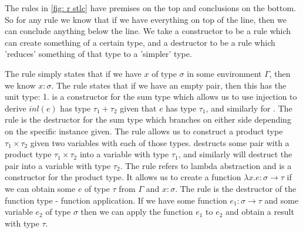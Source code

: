 \noindent
The rules in \ref{fig: r stlc} have premises on the top and conclusions on the bottom. So for any rule
we know that if we have everything on top of the line, then we can conclude anything below the line.
We take a constructor to be a rule which can create something of a certain type, and a destructor to be 
a rule which 'reduces' something of that type to a 'simpler' type.

The  rule simply states that if we have $x$ of type $\sigma$ in some environment $\Gamma$, 
then we know $x: \sigma$. The  rule states that if we have an empty pair, then this has 
the unit type: 1.  is a constructor for the sum type which allows us to use injection 
to derive $inl(e)$ has type $\tau_1 + \tau_2$ given that $e$ has type $\tau_1$, and similarly for 
. The  rule is the destructor for the sum type which branches on either
side depending on the specific instance given. %
The  rule allows us to construct a product type $\tau_1 \times \tau_2$ given two variables
with each of those types.  destructs some pair with a product type $\tau_1 \times \tau_2$ 
into a variable with type $\tau_1$, and similarly  will destruct the pair into a variable 
with type $\tau_2$. 
The  rule refers to lambda abstraction and is a constructor for the product type. It allows
us to create a function $\lambda x. e : \sigma \rightarrow \tau$ if we can obtain some $e$ of type $\tau$
from $\Gamma$ and $x: \sigma$. The  rule is the destructor of the function type - function 
application. If we have some function $e_1: \sigma \rightarrow \tau$ and some variable $e_2$ of type 
$\sigma$ then we can apply the function $e_1$ to $e_2$ and obtain a result with type $\tau$.




